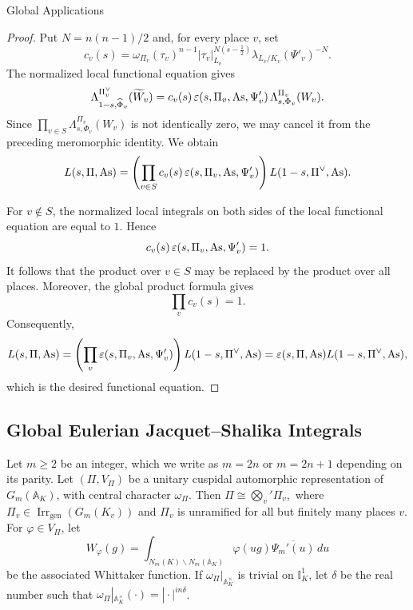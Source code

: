 \documentclass[12pt,reqno]{amsart}
\numberwithin{equation}{section}%
\numberwithin{equation}{subsection}
\theoremstyle{definition}
\theoremstyle{remark}
\begin{document}
\begin{section}{Global Applications}
\begin{proof}
Put \(N=n(n-1)/2\) and, for every place \(v\), set
\[
c_v(s)
=
\omega_{\Pi_v}(\tau_v)^{n-1}
|\tau_v|_{L_v}^{N(s-\frac12)}
\lambda_{L_v/K_v}(\Psi'_v)^{-N}.
\]
The normalized local functional equation gives
\[
\Lambda_{1-s,\widehat{\Phi}_v}^{\Pi_v^\vee}
(\widetilde W_v)
=
c_v(s)\,
\varepsilon(s,\Pi_v,{\rm As},\Psi'_v)\,
\Lambda_{s,\Phi_v}^{\Pi_v}(W_v).
\]
Since
$\prod\limits_{v\in S}
\Lambda_{s,\Phi_v}^{\Pi_v}(W_v)
$
is not identically zero, we may cancel it from the preceding
meromorphic identity. We obtain
\[
L(s,\Pi,{\rm As})
=
\left(
\prod_{v\in S}
c_v(s)\,
\varepsilon(s,\Pi_v,{\rm As},\Psi'_v)
\right)
L(1-s,\Pi^\vee,{\rm As}).
\]

For \(v\notin S\), the normalized local integrals on both sides of the
local functional equation are equal to \(1\). Hence
\[
c_v(s)\,
\varepsilon(s,\Pi_v,{\rm As},\Psi'_v)
=
1.
\]
It follows that the product over \(v\in S\) may be replaced by the
product over all places. Moreover, the global product formula
\cite[Proof of Theorem~3.9.1, p.~40]{BP2021} gives
\[
\prod_v c_v(s)=1.
\]
Consequently,
\[
L(s,\Pi,{\rm As})
=
\left(
\prod_v
\varepsilon(s,\Pi_v,{\rm As},\Psi'_v)
\right)
L(1-s,\Pi^\vee,{\rm As})
=
\varepsilon(s,\Pi,{\rm As})
L(1-s,\Pi^\vee,{\rm As}),
\]
which is the desired functional equation.
\end{proof}

\subsection{Global Eulerian Jacquet--Shalika Integrals}

Let $m \geq 2$ be an integer, which we write as $m = 2n$ or $m = 2n+1$ depending on its parity. Let \((\Pi,V_\Pi)\) be a unitary cuspidal automorphic
representation of \(G_m(\mathbb{A}_K)\), with central character \(\omega_\Pi\). Then $\Pi\cong\bigotimes_v'\Pi_v,$
where $
  \Pi_v\in\operatorname{Irr}_{\mathrm{gen}}(G_m(K_v))
$ and \(\Pi_v\) is unramified for all but finitely many places \(v\). For \(\varphi\in V_\Pi\), let
\[
  W_\varphi(g)
  =
  \int_{N_m(K)\backslash N_m(\mathbb{A}_K)}
  \varphi(ug)\overline{\Psi_m'(u)}\,du
\]
be the associated Whittaker function. If $\omega_\Pi|_{\mathbb{A}_K^\times}$ is trivial on $\mathbb{I}_K^1$, let $\delta$ be the real number such that $\omega_\Pi|_{\mathbb{A}_K^\times}(\cdot) = |\cdot|^{in\delta}$.


\end{section}
\end{document}
